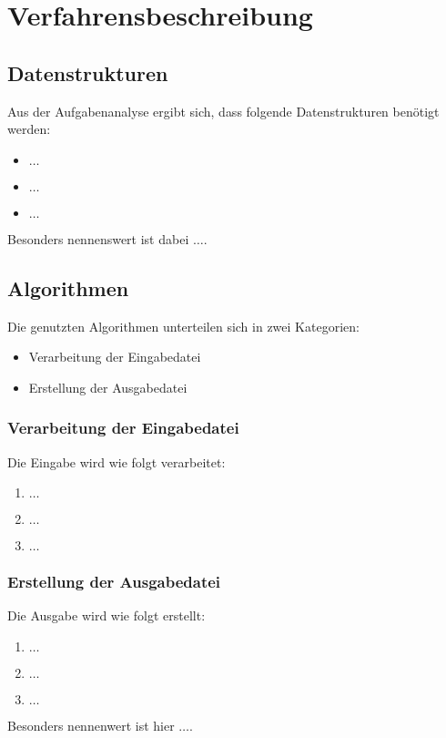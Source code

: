 \section{Verfahrensbeschreibung}
\label{sec:verfahrensbeschreibung}


\subsection{Datenstrukturen}
\label{ssec:datenstrukturen}

Aus der Aufgabenanalyse ergibt sich, dass folgende Datenstrukturen benötigt werden:

\begin{itemize}
    \item $\ldots$
    \item $\ldots$
    \item $\ldots$
\end{itemize}

Besonders nennenswert ist dabei $\ldots$.

\subsection{Algorithmen}
\label{ssec:algorithmen}

Die genutzten Algorithmen unterteilen sich in zwei Kategorien:
\begin{itemize}
    \item Verarbeitung der Eingabedatei
    \item Erstellung der Ausgabedatei
\end{itemize}

\subsubsection{Verarbeitung der Eingabedatei}
\label{sssec:verarbeitung_der_eingabedatei}

Die Eingabe wird wie folgt verarbeitet:

\begin{enumerate}
    \item $\ldots$
    \item $\ldots$
    \item $\ldots$
\end{enumerate}

\subsubsection{Erstellung der Ausgabedatei}
\label{sssec:erstellung_der_ausgabedatei}

Die Ausgabe wird wie folgt erstellt:

\begin{enumerate}
    \item $\ldots$
    \item $\ldots$
    \item $\ldots$
\end{enumerate}

Besonders nennenwert ist hier $\ldots$.
